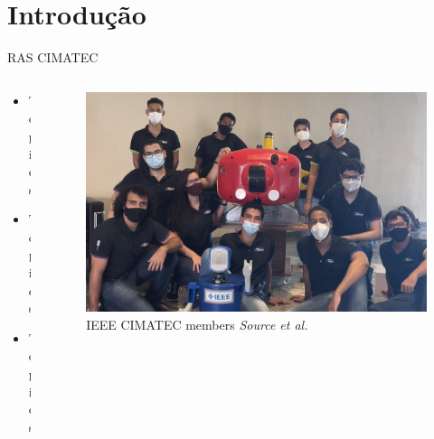 \section{Introdução}

\begin{frame}{RAS CIMATEC}
    \begin{columns}
        \begin{column}{0.4\textwidth}
            \begin{itemize}
                \item Topics
                \item Topics
                \item Topics
            \end{itemize}
        \end{column}

        \begin{column}{0.6\textwidth}
            \begin{figure}
                \centering
                \includegraphics[height = 0.6\textheight]{img/team2.png}
                \caption{IEEE CIMATEC members \textit{Source et al.}}
            \end{figure}
        \end{column}

    \end{columns}
\end{frame}

